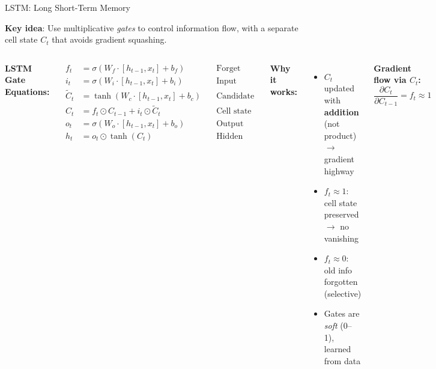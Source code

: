 \documentclass[aspectratio=169]{beamer}
\begin{document}
\begin{frame}{LSTM: Long Short-Term Memory}

\textbf{Key idea}: Use multiplicative \emph{gates} to control information flow, with a separate cell state $C_t$ that avoids gradient squashing.

\vspace{0.2cm}
\begin{columns}
\textbf{LSTM Gate Equations:}

\vspace{0.1cm}
{\small
\begin{align*}
f_t &= \sigma(W_f \cdot [h_{t-1}, x_t] + b_f) \quad &\text{Forget gate}\\
i_t &= \sigma(W_i \cdot [h_{t-1}, x_t] + b_i) \quad &\text{Input gate}\\
\tilde{C}_t &= \tanh(W_c \cdot [h_{t-1}, x_t] + b_c) \quad &\text{Candidate}\\
C_t &= f_t \odot C_{t-1} + i_t \odot \tilde{C}_t \quad &\text{Cell state}\\
o_t &= \sigma(W_o \cdot [h_{t-1}, x_t] + b_o) \quad &\text{Output gate}\\
h_t &= o_t \odot \tanh(C_t) \quad &\text{Hidden state}
\end{align*}
}

\textbf{Why it works:}
\begin{itemize}
    \item $C_t$ updated with \textbf{addition} (not product) $\to$ gradient highway
    \item $f_t \approx 1$: cell state preserved $\to$ no vanishing
    \item $f_t \approx 0$: old info forgotten (selective)
    \item Gates are \emph{soft} (0--1), learned from data
\end{itemize}

\vspace{0.2cm}
\textbf{Gradient flow via $C_t$:}
\[
\frac{\partial C_t}{\partial C_{t-1}} = f_t \approx 1
\]
\end{columns}
\end{frame}
\end{document}

